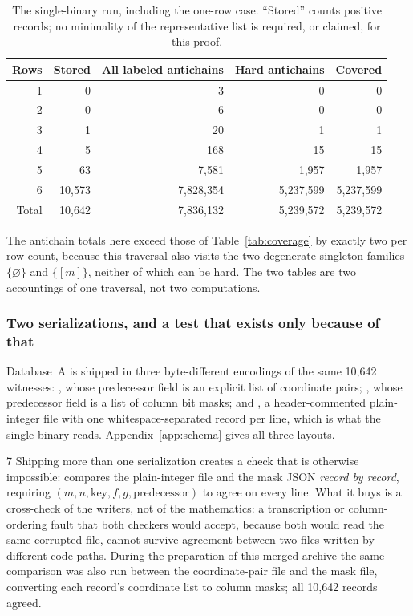 \documentclass[11pt,letterpaper]{article}
\numberwithin{equation}{section}
\theoremstyle{definition}
\theoremstyle{remark}
\newcommand{\code}[1]{\texttt{\detokenize{#1}}}
\newcommand{\dbA}{\textsf{A}}
\begin{document}
\begin{table}[htbp]
\centering
\caption{The single-binary run, including the one-row case. ``Stored'' counts
positive records; no minimality of the representative list is required, or
claimed, for this proof.}
\label{tab:counts-all}
\begin{tabular}{rrrrr}
\toprule
Rows & Stored & All labeled antichains & Hard antichains & Covered\\
\midrule
1 & 0 & 3 & 0 & 0\\
2 & 0 & 6 & 0 & 0\\
3 & 1 & 20 & 1 & 1\\
4 & 5 & 168 & 15 & 15\\
5 & 63 & 7,581 & 1,957 & 1,957\\
6 & 10,573 & 7,828,354 & 5,237,599 & 5,237,599\\
\midrule
Total & 10,642 & 7,836,132 & 5,239,572 & 5,239,572\\
\bottomrule
\end{tabular}
\end{table}

The antichain totals here exceed those of Table~\ref{tab:coverage} by exactly
two per row count, because this traversal also visits the two degenerate
singleton families $\{\varnothing\}$ and $\{[m]\}$, neither of which can be
hard. The two tables are two accountings of one traversal, not two
computations.

\subsubsection{Two serializations, and a test that exists only because of that}
\label{sec:serializations}
Database~\dbA{} is shipped in three byte-different encodings of the same
10,642 witnesses: , whose predecessor field
is an explicit list of coordinate pairs; ,
whose predecessor field is a list of column bit masks; and
, a header-commented plain-integer file with one
whitespace-separated record per line, which is what the single binary reads.
Appendix~\ref{app:schema} gives all three layouts.

\begin{variantbox}{7}
Shipping more than one serialization creates a check that is otherwise
impossible: \code{src/test_artifacts.py} compares the plain-integer file and
the mask JSON \emph{record by record}, requiring
$(m,n,\text{key},f,g,\text{predecessor})$ to agree on every line. What it
buys is a cross-check of the writers, not of the mathematics: a transcription
or column-ordering fault that both checkers would accept, because both would
read the same corrupted file, cannot survive agreement between two files
written by different code paths. During the preparation of this merged
archive the same comparison was also run between the coordinate-pair file and
the mask file, converting each record's coordinate list to column masks; all
10,642 records agreed.
\end{variantbox}
\end{document}
